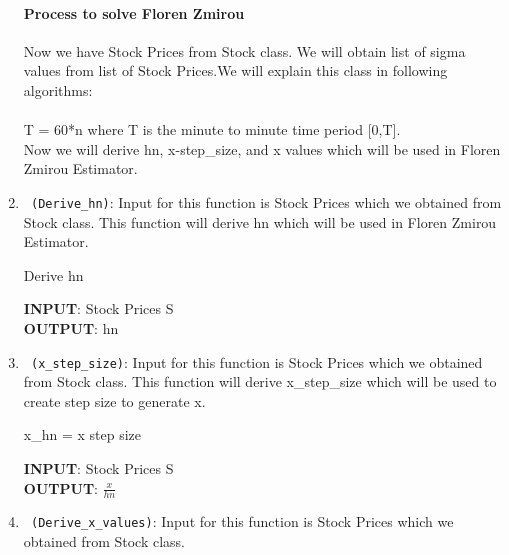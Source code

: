 \begin{enumerate}
\paragraph{Process to solve Floren Zmirou}
Now we have Stock Prices from Stock class. We will obtain list of sigma values from list of Stock Prices.We will explain this class in following algorithms:\\\\
T = 60*n where T is the minute to minute time period [0,T].\\
Now we will derive hn, x-step\_size, and x values which will be used in Floren Zmirou Estimator.
  \item \verb! (Derive_hn)!: Input for this function is Stock Prices which we obtained from Stock class. 
  This function will derive hn which will be used in Floren Zmirou Estimator.
  \begin{algorithm}
  \caption{Derive hn}
  \bigskip
  \textbf{INPUT}: Stock Prices S\\
  \textbf{OUTPUT}: hn
  \end{algorithm}
  \item \verb! (x_step_size)!: Input for this function is Stock Prices which we obtained from Stock class. 
  This function will derive x\_step\_size which will be used  to create step size to generate x.
  \begin{algorithm}
  \caption{x\_hn = x step size}
  \bigskip
  \textbf{INPUT}: Stock Prices S\\
  \textbf{OUTPUT}: $\frac{x}{hn}$
  \end{algorithm}
  \item \verb! (Derive_x_values)!: Input for this function is Stock Prices which we obtained from Stock class. 

\end{enumerate}

